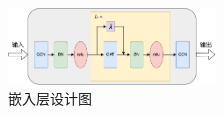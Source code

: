 \begin{figure}[htbp]
    \centering
    \includegraphics[width=0.49\textwidth]{嵌入层设计图.pdf}
    \caption{嵌入层设计图}
    \label{fig:嵌入层设计图}
\end{figure}